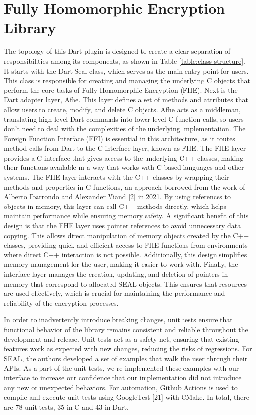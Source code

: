 \section{Fully Homomorphic Encryption Library}

The topology of this Dart plugin is designed to create a clear separation of responsibilities among its components, as shown in Table \ref{table:class-structure}. It starts with the Dart Seal class, which serves as the main entry point for users. This class is responsible for creating and managing the underlying C objects that perform the core tasks of Fully Homomorphic Encryption (FHE). Next is the Dart adapter layer, Afhe. This layer defines a set of methods and attributes that allow users to create, modify, and delete C objects. Afhe acts as a middleman, translating high-level Dart commands into lower-level C function calls, so users don’t need to deal with the complexities of the underlying implementation. The Foreign Function Interface (FFI) is essential in this architecture, as it routes method calls from Dart to the C interface layer, known as FHE. The FHE layer provides a C interface that gives access to the underlying C++ classes, making their functions available in a way that works with C-based languages and other systems. The FHE layer interacts with the C++ classes by wrapping their methods and properties in C functions, an approach borrowed from the work of Alberto Ibarrondo and Alexander Viand [2] in 2021. By using references to objects in memory, this layer can call C++ methods directly, which helps maintain performance while ensuring memory safety. A significant benefit of this design is that the FHE layer uses pointer references to avoid unnecessary data copying. This allows direct manipulation of memory objects created by the C++ classes, providing quick and efficient access to FHE functions from environments where direct C++ interaction is not possible. Additionally, this design simplifies memory management for the user, making it easier to work with. Finally, the interface layer manages the creation, updating, and deletion of pointers in memory that correspond to allocated SEAL objects. This ensures that resources are used effectively, which is crucial for maintaining the performance and reliability of the encryption processes.

In order to inadvertently introduce breaking changes, unit tests ensure that functional behavior of the library remains consistent and reliable throughout the development and release. Unit tests act as a safety net, ensuring that existing features work as expected with new changes, reducing the risks of regressions. For SEAL, the authors developed a set of examples that walk the user through their APIs. As a part of the unit tests, we re-implemented these examples with our interface to increase our confidence that our implementation did not introduce any new or unexpected behaviors. For automation, Github Actions is used to compile and execute unit tests using GoogleTest [21] with CMake. In total, there are 78 unit tests, 35 in C and 43 in Dart.

